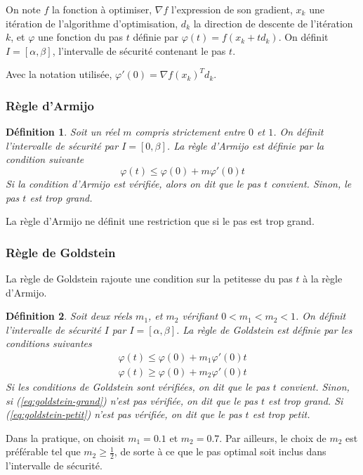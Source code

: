 \documentclass[3p, twocolumn]{elsarticle}
\newtheorem{definition}{Définition}[section]
\begin{document}
On note $f$ la fonction à optimiser, $\nabla f$ l'expression de son gradient, $x_k$ une itération de l'algorithme d'optimisation, $d_k$ la direction de descente de l'itération $k$, et $\varphi$ une fonction du pas $t$ définie par $\varphi(t)=f(x_k+td_k)$. On définit $I=[\alpha,\beta]$, l'intervalle de sécurité contenant le pas $t$.

\begin{rmk}
    Avec la notation utilisée, $\varphi'(0)=\nabla f(x_k)^T d_k$.
\end{rmk}
\subsubsection{Règle d'Armijo}
\begin{definition}
    Soit un réel $m$ compris strictement entre $0$ et $1$. On définit l'intervalle de sécurité par $I=[0,\beta]$. La règle d'Armijo est définie par la condition suivante
    \begin{equation}
        \varphi(t) \leq \varphi(0) + m\varphi'(0)t
        \label{eq:armijo}
    \end{equation}
    Si la condition d'Armijo est vérifiée, alors on dit que le pas $t$ convient. Sinon, le pas $t$ est trop grand.
\end{definition}
La règle d'Armijo ne définit une restriction que si le pas est trop grand.

\subsubsection{Règle de Goldstein}
La règle de Goldstein rajoute une condition sur la petitesse du pas $t$ à la règle d'Armijo.
\begin{definition}
    Soit deux réels $m_1$, et $m_2$ vérifiant $0<m_1<m_2<1$. On définit l'intervalle de sécurité $I$ par $I=[\alpha,\beta]$. La règle de Goldstein est définie par les conditions suivantes
    \begin{align}
        \varphi(t) \leq \varphi(0) + m_1\varphi'(0)t
        \label{eq:goldstein-grand} \\
        \varphi(t) \geq \varphi(0) + m_2\varphi'(0)t
        \label{eq:goldstein-petit}
    \end{align}
    Si les conditions de Goldstein sont vérifiées, on dit que le pas $t$ convient. Sinon, si (\ref{eq:goldstein-grand}) n'est pas vérifiée, on dit que le pas $t$ est trop grand. Si (\ref{eq:goldstein-petit}) n'est pas vérifiée, on dit que le pas $t$ est trop petit.
\end{definition}
\begin{rmk}
    Dans la pratique, on choisit $m_1=0.1$ et $m_2 = 0.7$. Par ailleurs, le choix de $m_2$ est préférable tel que $m_2\geq \frac12$, de sorte à ce que le pas optimal soit inclus dans l'intervalle de sécurité.
\end{rmk}
\end{document}
